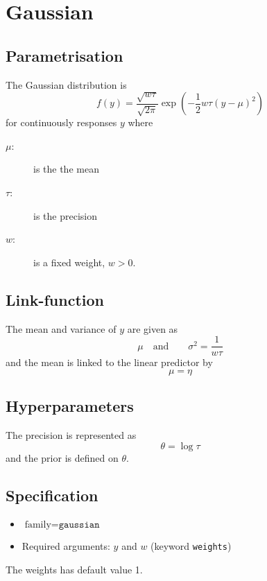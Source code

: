 \documentclass[a4paper,11pt]{article}
\begin{document}
\section*{Gaussian}

\subsection*{Parametrisation}

The Gaussian distribution is
\begin{displaymath}
    f(y) = \frac{\sqrt{w\tau}}{\sqrt{2\pi}} \exp\left( -\frac{1}{2}
      w\tau \left(y-\mu\right)^{2}\right)
\end{displaymath}
for continuously responses $y$ where
\begin{description}
\item[$\mu$:] is the the mean
\item[$\tau$:] is the precision
\item[$w$:] is a fixed weight, $w>0$.    
\end{description}

\subsection*{Link-function}

The mean and variance of $y$ are given as
\begin{displaymath}
    \mu \quad\text{and}\qquad \sigma^{2} = \frac{1}{w\tau}
\end{displaymath}
and the mean is linked to the linear predictor by
\begin{displaymath}
    \mu = \eta
\end{displaymath}

\subsection*{Hyperparameters}

The precision is represented as
\begin{displaymath}
    \theta = \log \tau
\end{displaymath}
and the prior is defined on $\theta$. 

\subsection*{Specification}

\begin{itemize}
\item $\text{family}=\texttt{gaussian}$
\item Required arguments: $y$ and $w$ (keyword \texttt{weights})
\end{itemize}
The weights has default value 1.
\end{document}
